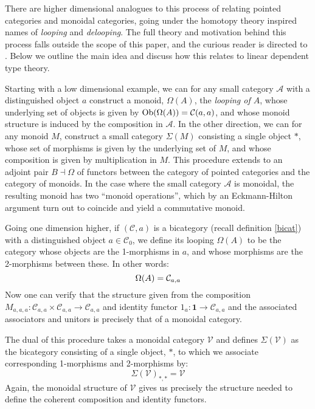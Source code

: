There are higher dimensional analogues to this process of relating pointed categories and monoidal categories, going under the homotopy theory inspired names of \textit{looping} and \textit{delooping}. The full theory and motivation behind this process falls outside the scope of this paper, and the curious reader is directed to \cite{n-cats}. Below we outline the main idea and discuss how this relates to linear dependent type theory.

Starting with a low dimensional example, we can for any small category $\mathcal{A}$ with a distinguished object $a$ construct a monoid, $\Omega(A)$, the \textit{looping of $A$}, whose underlying set of objects is given by $\operatorname{\text{Ob}}(\Omega(A)) = \mathcal{C}(a,a)$, and whose monoid structure is induced by the composition in $\mathcal{A}$. In the other direction, we can for any monoid $M$, construct a small category $\Sigma(M)$ consisting a single object $*$, whose set of morphisms is given by the underlying set of $M$, and whose composition is given by multiplication in $M$. This procedure extends to an adjoint pair $B \dashv \Omega$ of functors between the category of pointed categories and the category of monoids.
In the case where the small category $\mathcal{A}$ is monoidal, the resulting monoid has two ``monoid operations'', which by an Eckmann-Hilton argument turn out to coincide and yield a commutative monoid.

Going one dimension higher, if $(\mathcal{C}, a)$ is a bicategory (recall definition \ref{bicat}) with a distinguished object $a \in \mathcal{C}_0$, we define its looping $\Omega(A)$ to be the category whose objects are the 1-morphisms in $a$, and whose morphisms are the 2-morphisms between these. In other words:
\[
  \Omega(A) = \mathcal{C}_{a,a}\\
\]
Now one can verify that the structure given from the composition $M_{a,a,a} : \mathcal{C}_{a,a} \times \mathcal{C}_{a,a} \to \mathcal{C}_{a,a}$ and identity functor $1_a : \mathbf{1} \to \mathcal{C}_{a,a}$ and the associated associators and unitors is precisely that of a monoidal category.

The dual of this procedure takes a monoidal category $\mathcal{V}$ and defines $\Sigma(\mathcal{V})$ as the bicategory consisting of a single object, $*$, to which we associate corresponding 1-morphisms and 2-morphisms by:
\[
\Sigma(\mathcal{V})_{*,*} = \mathcal{V}
\]
Again, the monoidal structure of $\mathcal{V}$ gives us precisely the structure needed to define the coherent composition and identity functors.

